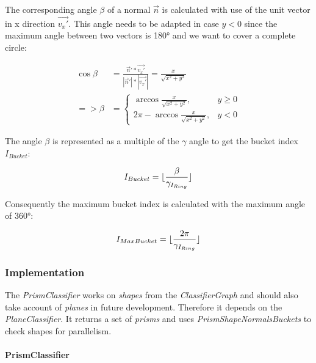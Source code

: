 \documentclass[../ClassicThesis.tex]{subfiles}
\begin{document}
The corresponding angle $ \beta $ of a normal $ \vec{n} $ is calculated with use of the unit vector in x direction $ \vec{v_{x}'} $. This angle needs to be adapted in case $ y < 0 $ since the maximum angle between two vectors is 180° and we want to cover a complete circle:

\begin{equation}
\begin{split}
    \cos{\beta} & = \frac{\vec{n}' * \vec{v_{x}'}}{|\vec{n}'| * |\vec{v_{x}'}|} = \frac{x}{\sqrt{x^{2} + y^{2}}} \\
    => \beta & = \begin{cases}
        \arccos{ \frac{x}{\sqrt{x^{2} + y^{2}}} }, & y \geq 0 \\
        2 \pi - \arccos{ \frac{x}{\sqrt{x^{2} + y^{2}}} }, & y < 0
    \end{cases}
\end{split}
\end{equation}

The angle $ \beta $ is represented as a multiple of the $ \gamma $ angle to get the bucket index $ I_{Bucket} $:

\begin{equation}
    I_{Bucket} = \lfloor\frac{\beta}{ {\gamma}_{I_{Ring}} }\rfloor
\end{equation}

Consequently the maximum bucket index is calculated with the maximum angle of 360°:

\begin{equation}
    I_{MaxBucket} = \lfloor\frac{2 \pi}{ {\gamma}_{I_{Ring}} }\rfloor
\end{equation}



\subsubsection{Implementation}

The \emph{PrismClassifier} works on \emph{shapes} from the \emph{ClassifierGraph} and should also take account of \emph{planes} in future development. Therefore it depends on the \emph{PlaneClassifier}.  It returns a set of \emph{prisms} and uses \emph{PrismShapeNormalsBuckets} to check shapes for parallelism.

\paragraph{PrismClassifier}
\end{document}
